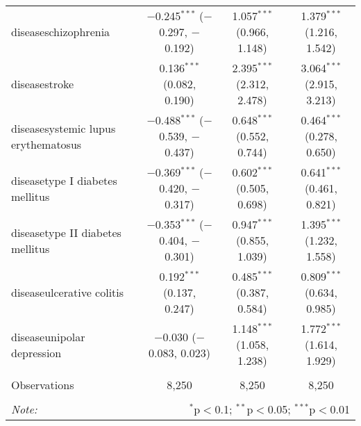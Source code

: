 \begin{table}[!htbp]
\begin{tabular}{@{\extracolsep{5pt}}lccc}
  diseaseschizophrenia & $-$0.245$^{***}$ ($-$0.297, $-$0.192) & 1.057$^{***}$ (0.966, 1.148) & 1.379$^{***}$ (1.216, 1.542) \\ 
  diseasestroke & 0.136$^{***}$ (0.082, 0.190) & 2.395$^{***}$ (2.312, 2.478) & 3.064$^{***}$ (2.915, 3.213) \\ 
  diseasesystemic lupus erythematosus & $-$0.488$^{***}$ ($-$0.539, $-$0.437) & 0.648$^{***}$ (0.552, 0.744) & 0.464$^{***}$ (0.278, 0.650) \\ 
  diseasetype I diabetes mellitus & $-$0.369$^{***}$ ($-$0.420, $-$0.317) & 0.602$^{***}$ (0.505, 0.698) & 0.641$^{***}$ (0.461, 0.821) \\ 
  diseasetype II diabetes mellitus & $-$0.353$^{***}$ ($-$0.404, $-$0.301) & 0.947$^{***}$ (0.855, 1.039) & 1.395$^{***}$ (1.232, 1.558) \\ 
  diseaseulcerative colitis & 0.192$^{***}$ (0.137, 0.247) & 0.485$^{***}$ (0.387, 0.584) & 0.809$^{***}$ (0.634, 0.985) \\ 
  diseaseunipolar depression & $-$0.030 ($-$0.083, 0.023) & 1.148$^{***}$ (1.058, 1.238) & 1.772$^{***}$ (1.614, 1.929) \\ 
 \hline \\[-1.8ex] 
Observations & 8,250 & 8,250 & 8,250 \\ 
\hline 
\hline \\[-1.8ex] 
\textit{Note:}  & \multicolumn{3}{r}{$^{*}$p$<$0.1; $^{**}$p$<$0.05; $^{***}$p$<$0.01} \\ 
\end{tabular} 
\end{table} 
